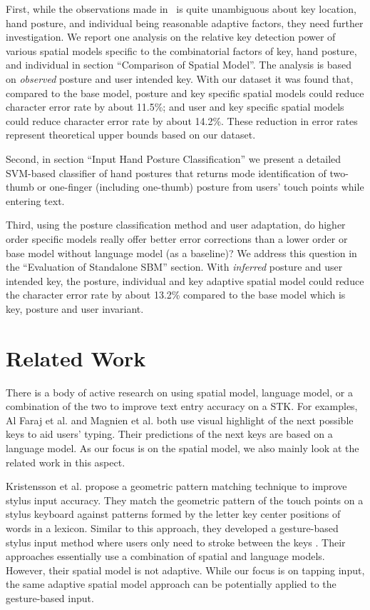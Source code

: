 \documentclass{sigchi}
\begin{document}
First, while the observations made in~\cite{Azenkot:2012} is quite unambiguous 
about key location, hand posture, and individual being reasonable adaptive 
factors, they need further investigation.  We report one analysis on the 
relative key detection power of various spatial models specific to the 
combinatorial factors of key, hand posture, and individual in section 
``Comparison of Spatial Model''. The analysis is based on \textit{observed} 
posture and user intended key. With our dataset it was found that, compared to
the base model, posture and key specific spatial models could reduce character
error rate by about 11.5\%; and user and key specific spatial models could
reduce character error rate by about 14.2\%. These reduction in error rates
represent theoretical upper bounds based on our dataset.

Second, in section ``Input Hand Posture Classification'' we present a detailed 
SVM-based classifier of hand postures that returns mode identification of 
two-thumb or one-finger (including one-thumb) posture from users' touch points while entering text.

Third, using the posture classification method and user adaptation, do higher 
order specific models really offer better error corrections than a lower order 
or base model without language model (as a baseline)? We address this question 
in the ``Evaluation of Standalone SBM'' section. With \textit{inferred} posture 
and user intended key, the posture, individual and key adaptive spatial model 
could reduce the character error rate by about 13.2\% compared to
the base model which is key, posture and user invariant.

\section{Related Work}
There is a body of active research on using spatial model, language model, or a combination
of the two to improve text entry accuracy on a STK. For examples, 
Al Faraj et al. \cite{AlFaraj:2009} and Magnien et al. \cite{Magnien:2004} both use
visual highlight of the next possible keys to aid users' typing. Their 
predictions of the next keys are based on a language model. As our focus is on 
the spatial model, we also mainly look at the related work in this aspect.

Kristensson et al. \cite{Kristensson:2005} propose a geometric pattern matching technique to improve 
stylus input accuracy. They match the geometric pattern of the touch points on 
a stylus keyboard against patterns formed by the letter key center positions of 
words in a lexicon. Similar to this approach, they developed a gesture-based stylus input method where users only need to stroke between the keys \cite{Kristensson:2004}.
Their approaches essentially use a combination of spatial and language models. However, 
their spatial model is not adaptive. While our focus is on tapping input, the same adaptive spatial model approach
can be potentially applied to the gesture-based input.
\end{document}

